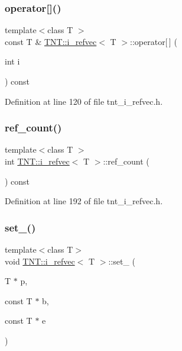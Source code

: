 \subsubsection{\texorpdfstring{operator[]()}{operator[]()}\hspace{0.1cm}{\footnotesize\ttfamily [2/2]}}
{\footnotesize\ttfamily template$<$class T $>$ \\
const T \& \hyperlink{classTNT_1_1i__refvec}{T\+N\+T\+::i\+\_\+refvec}$<$ T $>$\+::operator\mbox{[}$\,$\mbox{]} (\begin{DoxyParamCaption}\item[{int}]{i }\end{DoxyParamCaption}) const\hspace{0.3cm}{\ttfamily [inline]}}



Definition at line 120 of file tnt\+\_\+i\+\_\+refvec.\+h.

\mbox{\label{classTNT_1_1i__refvec_af2d6f32ba752f836bd08bcad0d0b72b6}} 
\subsubsection{\texorpdfstring{ref\+\_\+count()}{ref\_count()}}
{\footnotesize\ttfamily template$<$class T $>$ \\
int \hyperlink{classTNT_1_1i__refvec}{T\+N\+T\+::i\+\_\+refvec}$<$ T $>$\+::ref\+\_\+count (\begin{DoxyParamCaption}{ }\end{DoxyParamCaption}) const\hspace{0.3cm}{\ttfamily [inline]}}



Definition at line 192 of file tnt\+\_\+i\+\_\+refvec.\+h.

\mbox{\label{classTNT_1_1i__refvec_ae24b3e948c0f8052ac64cf70fe7805ad}} 
\subsubsection{\texorpdfstring{set\+\_\+()}{set\_()}}
{\footnotesize\ttfamily template$<$class T$>$ \\
void \hyperlink{classTNT_1_1i__refvec}{T\+N\+T\+::i\+\_\+refvec}$<$ T $>$\+::set\+\_\+ (\begin{DoxyParamCaption}\item[{T $\ast$}]{p,  }\item[{const T $\ast$}]{b,  }\item[{const T $\ast$}]{e }\end{DoxyParamCaption})}



